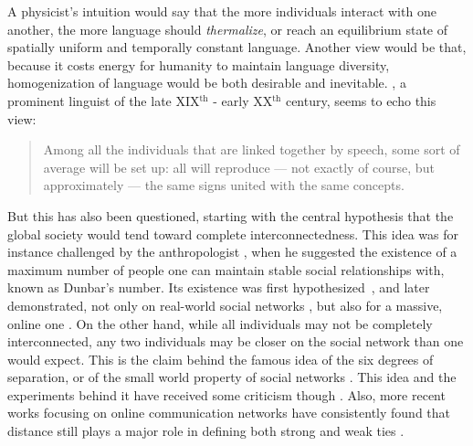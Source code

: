 \documentclass[../thesis.tex]{subfiles}
\begin{document}

A physicist's intuition would say that the more individuals interact with one another,
the more language should \emph{thermalize}, or reach an equilibrium state of spatially
uniform and temporally constant language. Another view would be that, because it costs
energy for humanity to maintain language diversity, homogenization of language would be
both desirable and inevitable.
, a prominent linguist of the
late XIX$^\text{th}$ - early XX$^\text{th}$ century, seems to echo this view:

\begin{quote}
  Among all the individuals that are linked together by speech, some sort of average
  will be set up: all will reproduce --- not exactly of course, but approximately ---
  the same signs united with the same concepts. \cite{deSaussureCourseGeneral2011}
\end{quote}


But this has also been questioned, starting with the central hypothesis that the global
society would tend toward complete interconnectedness. This idea was for instance
challenged by the anthropologist , when he
suggested the existence of a maximum number of people one can maintain stable social
relationships with, known as Dunbar's number. Its existence was first
hypothesized~\cite{DunbarNeocortexSize1992,DunbarSocialBrain1998}, and later
demonstrated, not only on real-world social networks
\cite{HillSocialNetwork2003,McCartyComparingTwo2005}, but also for a massive, online one
\cite{GoncalvesModelingUsers2011}.
On the other hand, while all individuals may not be completely interconnected, any two
individuals may be closer on the social network than one would expect. This is the claim
behind the famous idea of the six degrees of separation, or of the small world property
of social networks
\cite{deSolaPoolContactsInfluence1978,MilgramSmallWorld1967,TraversExperimentalStudy1977a,WattsCollectiveDynamics1998}.
This idea and the experiments behind it have received some criticism though
\cite{KleinfeldSmallWorld2002}. Also, more recent works focusing on online communication
networks have consistently found that distance still plays a major role in defining both
strong and weak ties
\cite{LeskovecPlanetaryscaleViews2008,TakhteyevGeographyTwitter2012a,Garcia-GavilanesTwitterAin2014}. 
\end{document}
